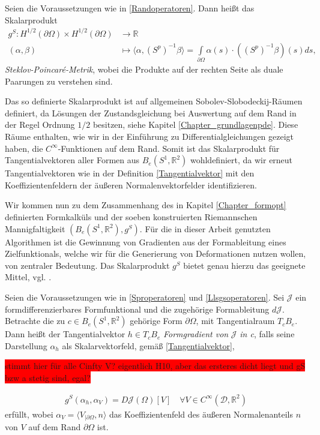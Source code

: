\begin{defi}\label{Stek-Poi-metrik}
Seien die Voraussetzungen wie in \ref{Randoperatoren}. Dann heißt das Skalarprodukt
\begin{align*}
	g^S: H^{1/2}(\partial \Omega) \times H^{1/2}(\partial \Omega) &\rightarrow \mathbb{R} \\
	(\alpha,\beta) &\mapsto \langle \alpha, (S^p)^{-1}\beta \rangle = \underset{\partial \Omega}{\int} \alpha(s)\cdot((S^p)^{-1}\beta)(s)ds,
\end{align*}
\textit{Steklov-Poincaré-Metrik}, wobei die Produkte auf der rechten Seite als duale Paarungen zu verstehen sind. 
\end{defi}

Das so definierte Skalarprodukt ist auf allgemeinen Sobolev-Slobodeckij-Räumen definiert, da Lösungen der Zustandsgleichung bei Auswertung auf dem Rand in der Regel Ordnung $1/2$ besitzen, siehe Kapitel \ref{Chapter_grundlagenpde}. Diese Räume enthalten, wie wir in der Einführung zu Differentialgleichungen gezeigt haben, die $C^\infty$-Funktionen auf dem Rand. Somit ist das Skalarprodukt für Tangentialvektoren aller Formen aus $B_e(S^1, \mathbb{R}^2)$ wohldefiniert, da wir erneut Tangentialvektoren wie in der Definition \ref{Tangentialvektor} mit den Koeffizientenfeldern der äußeren Normalenvektorfelder identifizieren.

Wir kommen nun zu dem Zusammenhang des in Kapitel \ref{Chapter_formopt} definierten Formkalküls und der soeben konstruierten Riemannschen Mannigfaltigkeit $(B_e(S^1,\mathbb{R}^2),g^S)$.
Für die in dieser Arbeit genutzten Algorithmen ist die Gewinnung von Gradienten aus der Formableitung eines Zielfunktionals, welche wir für die Generierung von Deformationen nutzen wollen, von zentraler Bedeutung. Das Skalarprodukt $g^S$ bietet genau hierzu das geeignete Mittel, vgl. \cite{bfgs2}.

\begin{defi}[Formgradient]\label{Formgradientdefi}
Seien die Voraussetzungen wie in \ref{Sproperatoren} und \ref{Llsgsoperatoren}.
Sei $\mathcal{J}$ ein formdifferenzierbares Formfunktional und die zugehörige Formableitung $d\mathcal{J}$. Betrachte die zu $c\in B_e(S^1,\mathbb{R}^2)$ gehörige Form $\partial\Omega$, mit Tangentialraum $T_cB_e$. Dann heißt der Tangentialvektor $h\in T_cB_e$ \textit{Formgradient von} $\mathcal{J}$ \textit{in c}, falls seine Darstellung $\alpha_h$ als Skalarvektorfeld, gemäß \ref{Tangentialvektor}, 

\colorbox{red}{stimmt hier für alle Cinfty V? eigentlich H10, aber das ersteres dicht liegt und gS bzw a stetig sind, egal?}

\begin{align}\label{Gradientengleichung}
	g^S(\alpha_h, \alpha_V) = D\mathcal{J}(\Omega)[V] \quad \forall V\in C^\infty(\mathcal{D},\mathbb{R}^2)
\end{align}
erfüllt, wobei $\alpha_V = \langle V_{\vert \partial\Omega}, n\rangle$ das Koeffizientenfeld des äußeren Normalenanteils $n$ von $V$ auf dem Rand $\partial \Omega$ ist.

\end{defi}

